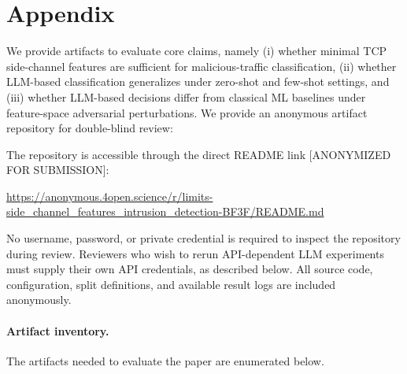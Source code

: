 \documentclass[conference]{IEEEtran}
\begin{document}




\section*{Appendix}
\label{appendix}

We provide artifacts to evaluate core claims, namely (i) whether minimal TCP side-channel features are sufficient for malicious-traffic classification, (ii) whether LLM-based classification generalizes under zero-shot and few-shot settings, and (iii) whether LLM-based decisions differ from classical ML baselines under feature-space adversarial perturbations. We provide an anonymous artifact repository for double-blind review:

The repository is accessible through the direct README link [ANONYMIZED FOR SUBMISSION]:
\begin{center}
\url{https://anonymous.4open.science/r/limits-side_channel_features_intrusion_detection-BF3F/README.md}
\end{center}

No username, password, or private credential is required to inspect the repository during review. Reviewers who wish to rerun API-dependent LLM experiments must supply their own API credentials, as described below. All source code, configuration, split definitions, and available result logs are included anonymously.

\paragraph{Artifact inventory.}
The artifacts needed to evaluate the paper are enumerated below.
\end{document}
